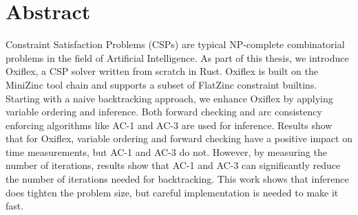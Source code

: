 
\chapter*{Abstract}

Constraint Satisfaction Problems (CSPs) are typical NP-complete combinatorial problems in the field of Artificial Intelligence. As part of this thesis, we introduce Oxiflex, a CSP solver written from scratch in Rust. Oxiflex is built on the MiniZinc tool chain and supports a subset of FlatZinc constraint builtins. Starting with a naive backtracking approach, we enhance Oxiflex by applying variable ordering and inference. Both forward checking and arc consistency enforcing algorithms like AC-1 and AC-3 are used for inference. Results show that for Oxiflex, variable ordering and forward checking have a positive impact on time measurements, but AC-1 and AC-3 do not. However, by measuring the number of iterations, results show that AC-1 and AC-3 can significantly reduce the number of iterations needed for backtracking. This work shows that inference does tighten the problem size, but careful implementation is needed to make it fast.

